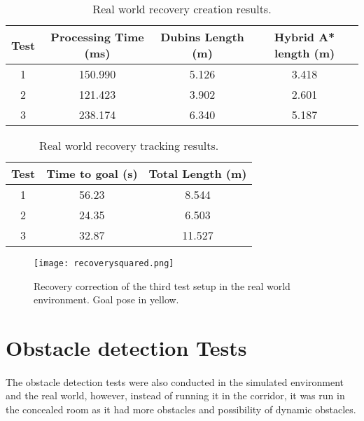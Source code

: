 \begin{table}[H]
    \centering
    \begin{tabular}{|c|c|c|c|}
        \hline
        \textbf{Test} & \textbf{Processing Time (ms)} & \textbf{Dubins Length (m)} & \textbf{Hybrid A* length (m)} \\
        \hline
        1 & 150.990 & 5.126 & 3.418 \\
        \hline
        2 & 121.423 & 3.902 & 2.601 \\
        \hline
        3 & 238.174 & 6.340 & 5.187 \\
        \hline
    \end{tabular}
    \caption{Real world recovery creation results.}
    \label{tab:real_recovery_test_results1}
\end{table}
\begin{table}[H]
    \centering
    \begin{tabular}{|c|c|c|}
        \hline
        \textbf{Test} & \textbf{Time to goal (s)} & \textbf{Total Length (m)} \\
        \hline
        1 & 56.23 & 8.544 \\
        \hline
        2 & 24.35 & 6.503 \\
        \hline
        3 & 32.87 & 11.527 \\
        \hline
    \end{tabular}
    \caption{Real world recovery tracking results.}
    \label{tab:real_recovery_test_results2}
\end{table}


\begin{figure}[h]
    \centering
    \texttt{[image: recoverysquared.png]}
    \caption{Recovery correction of the third test setup in the real world environment. Goal pose in yellow.}
    \label{fig:real_recovery_test4}
\end{figure}

\section{Obstacle detection Tests}
\label{sec:obstacle_detection_tests}
\paragraph{}The obstacle detection tests were also conducted in the simulated environment 
and the real world, however, instead of running it in the corridor, it was run 
in the concealed room as it had more obstacles and possibility of dynamic obstacles.

